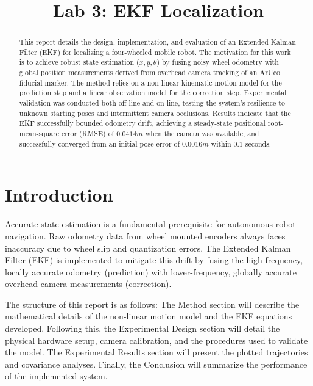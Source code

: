 \documentclass[conference]{IEEEtran}
\begin{document}
\title{Lab 3: EKF Localization}

\author{
}

\maketitle

\begin{abstract}
This report details the design, implementation, and evaluation of an Extended Kalman Filter (EKF) for localizing a four-wheeled mobile robot. The motivation for this work is to achieve robust state estimation ($x, y, \theta$) by fusing noisy wheel odometry with global position measurements derived from overhead camera tracking of an ArUco fiducial marker. The method relies on a non-linear kinematic motion model for the prediction step and a linear observation model for the correction step. Experimental validation was conducted both off-line and on-line, testing the system's resilience to unknown starting poses and intermittent camera occlusions. Results indicate that the EKF successfully bounded odometry drift, achieving a steady-state positional root-mean-square error (RMSE) of $0.0414 m$ when the camera was available, and successfully converged from an initial pose error of $0.0016 m$ within $0.1$ seconds.
\end{abstract}

\section{Introduction}
Accurate state estimation is a fundamental prerequisite for autonomous robot navigation. Raw odometry data from wheel mounted encoders always faces inaccuracy due to wheel slip and quantization errors. The Extended Kalman Filter (EKF) is implemented to mitigate this drift by fusing the high-frequency, locally accurate odometry (prediction) with lower-frequency, globally accurate overhead camera measurements (correction). 

The structure of this report is as follows: The Method section will describe the mathematical details of the non-linear motion model and the EKF equations developed. Following this, the Experimental Design section will detail the physical hardware setup, camera calibration, and the procedures used to validate the model. The Experimental Results section will present the plotted trajectories and covariance analyses. Finally, the Conclusion will summarize the performance of the implemented system.
\end{document}
